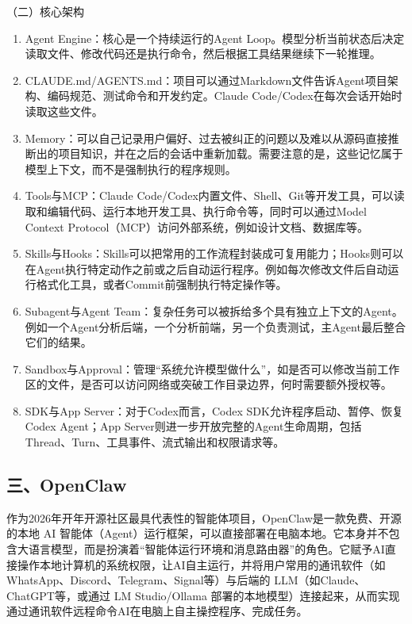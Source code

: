 （二）核心架构

\begin{enumerate}
\def\labelenumi{\arabic{enumi}.}
\item
  Agent Engine：核心是一个持续运行的Agent Loop。模型分析当前状态后决定读取文件、修改代码还是执行命令，然后根据工具结果继续下一轮推理。
\item
  CLAUDE.md/AGENTS.md：项目可以通过Markdown文件告诉Agent项目架构、编码规范、测试命令和开发约定。Claude Code/Codex在每次会话开始时读取这些文件。
\item
  Memory：可以自己记录用户偏好、过去被纠正的问题以及难以从源码直接推断出的项目知识，并在之后的会话中重新加载。需要注意的是，这些记忆属于模型上下文，而不是强制执行的程序规则。
\item
  Tools与MCP：Claude Code/Codex内置文件、Shell、Git等开发工具，可以读取和编辑代码、运行本地开发工具、执行命令等，同时可以通过Model Context Protocol（MCP）访问外部系统，例如设计文档、数据库等。
\item
  Skills与Hooks：Skills可以把常用的工作流程封装成可复用能力；Hooks则可以在Agent执行特定动作之前或之后自动运行程序。例如每次修改文件后自动运行格式化工具，或者Commit前强制执行特定操作等。
\item
  Subagent与Agent Team：复杂任务可以被拆给多个具有独立上下文的Agent。例如一个Agent分析后端，一个分析前端，另一个负责测试，主Agent最后整合它们的结果。
\item
  Sandbox与Approval：管理``系统允许模型做什么''，如是否可以修改当前工作区的文件，是否可以访问网络或突破工作目录边界，何时需要额外授权等。
\item
  SDK与App Server：对于Codex而言，Codex SDK允许程序启动、暂停、恢复Codex Agent；App Server则进一步开放完整的Agent生命周期，包括Thread、Turn、工具事件、流式输出和权限请求等。
\end{enumerate}

\hypertarget{ux4e09openclaw}{%
\subsection{三、OpenClaw}\label{ux4e09openclaw}}

作为2026年开年开源社区最具代表性的智能体项目，OpenClaw是一款免费、开源的本地 AI 智能体（Agent）运行框架，可以直接部署在电脑本地。它本身并不包含大语言模型，而是扮演着``智能体运行环境和消息路由器''的角色。它赋予AI直接操作本地计算机的系统权限，让AI自主运行，并将用户常用的通讯软件（如WhatsApp、Discord、Telegram、Signal等）与后端的 LLM（如Claude、ChatGPT等，或通过 LM Studio/Ollama 部署的本地模型）连接起来，从而实现通过通讯软件远程命令AI在电脑上自主操控程序、完成任务。

